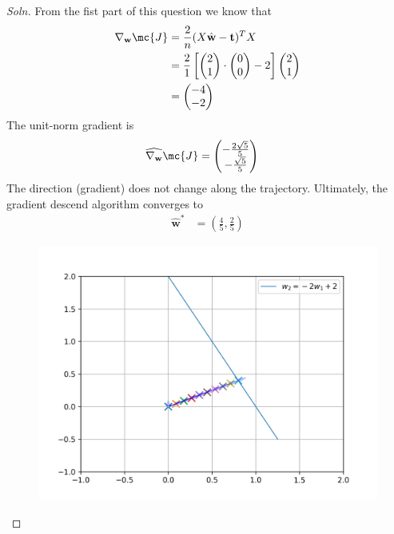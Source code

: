 \documentclass{article}
\begin{document}
	\subsubsection{}
	\begin{proof}[Soln]
		From the fist part of this question we know that
		\begin{align}
			\nabla_{\textbf{w}} \mc{J} 
			&= \frac{2}{n} (X \hat{\textbf{w}} - \textbf{t})^T X \\
			&= \frac{2}{1} \left [
			\begin{pmatrix}2 \\ 1 \end{pmatrix}
			\cdot
			\begin{pmatrix}
			0 \\ 0	
			\end{pmatrix}
			- 2
			\right ]
			\begin{pmatrix}
				2 \\ 1
			\end{pmatrix} \\
			&= \begin{pmatrix}
				-4 \\ -2
			\end{pmatrix}
		\end{align}
		The unit-norm gradient is
		\begin{align}
			\widehat{\nabla_{\textbf{w}}} \mc{J} 
			&= \begin{pmatrix}
				- \frac{2\sqrt{5}}{5} \\
				- \frac{\sqrt{5}}{5}
			\end{pmatrix}
		\end{align}
		The direction (gradient) does not change along the trajectory.
		Ultimately, the gradient descend algorithm converges to 
		\begin{align}
			\hat{\textbf{w}}^*
			&= \left(\frac{4}{5}, \frac{2}{5} \right)
		\end{align}
		\begin{figure}[H]
			\center
			\includegraphics[width=0.7\linewidth]{grad_desc.png}
		\end{figure}
	\end{proof}
	
\end{document}
